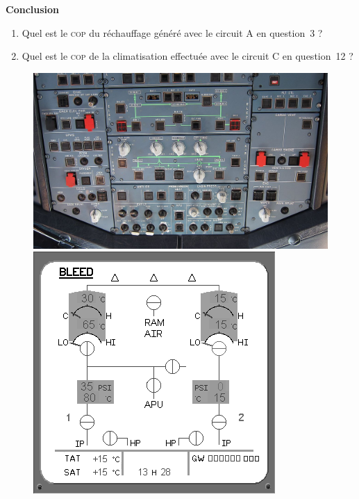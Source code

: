 \textbf{Conclusion}
	
	\begin{enumerate}
		\item Quel est le \textsc{cop} du réchauffage généré avec le circuit A en question~3 ?
		\item Quel est le \textsc{cop} de la climatisation effectuée avec le circuit C en question~12 ?
	\end{enumerate}

	\begin{figure}[!t]
		\begin{center}
			\includegraphics[width=\textwidth]{images/320_panel.jpg}
			\includegraphics[width=\textwidth]{images/320_efis.png} %
		\end{center}
		\label{fig_320_ecs}
	\end{figure}	

